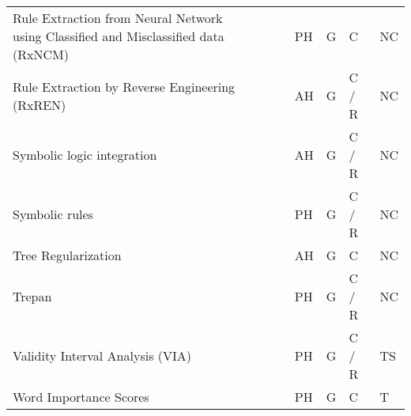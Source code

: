 \documentclass[final,1p,times]{elsarticle}
\begin{document}
\begin{table}[htbp]
\begin{tabular}{m{4.2cm} m{2cm} m{0.5cm} m{0.5cm} m{0.5cm} m{0.6cm} m{0.8cm} m{1.1cm}}
    Rule Extraction from Neural Network using Classified and Misclassified data (RxNCM) &  \citeauthor{biswas2017rule} &  \cite{biswas2017rule} &  \citeyear{biswas2017rule} & PH & G & C & NC\\
    Rule Extraction by Reverse Engineering (RxREN) &  \citeauthor{augasta2012reverse} &  \cite{augasta2012reverse} &  \citeyear{augasta2012reverse} & AH & G & C / R & NC\\
    Symbolic logic integration &  \citeauthor{tran2017unsupervised} &  \cite{tran2017unsupervised} &  \citeyear{tran2017unsupervised} & AH & G & C / R & NC\\
    Symbolic rules &  \citeauthor{garcez2001symbolic} &  \cite{garcez2001symbolic} &  \citeyear{garcez2001symbolic} & PH & G & C / R & NC\\
    Tree Regularization &  \citeauthor{wu2018beyond} &  \cite{wu2018beyond} &  \citeyear{wu2018beyond} & AH & G & C & NC\\
    Trepan &  \citeauthor{craven1994using, craven1996extracting} &  \cite{craven1994using, craven1996extracting} &  \citeyear{craven1994using, craven1996extracting} & PH & G & C / R & NC\\
    Validity Interval Analysis (VIA) &  \citeauthor{thrun1995extracting} &  \cite{thrun1995extracting} &  \citeyear{thrun1995extracting} & PH & G & C / R & TS\\
    Word Importance Scores &  \citeauthor{murdoch2017automatic} &  \cite{murdoch2017automatic} &  \citeyear{murdoch2017automatic} & PH & G & C & T\\
    \hline
\end{tabular}
\end{table}
\end{document}
